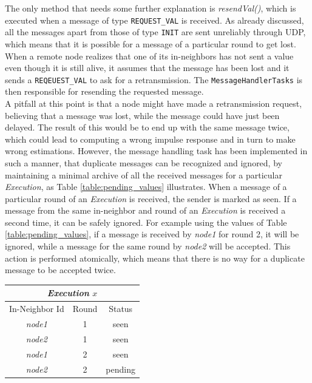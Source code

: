 \documentclass[a4paper,11pt,twoside]{report}
\newcommand{\classname}[1]{\texttt{#1}}
\begin{document}
\begin{description}
The only method that needs some further explanation is \textit{resendVal()}, which is executed when a message of type \classname{REQUEST\_VAL} is received. As already discussed, all the messages apart from those of type \classname{INIT} are sent unreliably through UDP, which means that it is possible for a message of a particular round to get lost. When a remote node realizes that one of its in-neighbors has not sent a value even though it is still alive, it assumes that the message has been lost and it sends a \classname{REQEUEST\_VAL} to ask for a retransmission. The \classname{MessageHandlerTasks} is then responsible for resending the requested message.\\

A pitfall at this point is that a node might have made a retransmission request, believing that a message was lost, while the message could have just been delayed. The result of this would be to end up with the same message twice, which could lead to computing a wrong impulse response and in turn to make wrong estimations. However, the message handling task has been implemented in such a manner, that duplicate messages can be recognized and ignored, by maintaining a minimal archive of all the received messages for a particular \textit{Execution}, as Table \ref{table:pending_values} illustrates. When a message of a particular round of an \textit{Execution} is received, the sender is marked as seen. If a message from the same in-neighbor and round of an \textit{Execution} is received a second time, it can be safely ignored. For example using the values of Table \ref{table:pending_values}, if a message is received by \textit{node1} for round 2, it will be ignored, while a message for the same round by \textit{node2} will be accepted. This action is performed atomically, which means that there is no way for a duplicate message to be accepted twice. 

\begin{table}[H]
\centering
\begin{tabular}{|c|c|c|}

\hline
\multicolumn{3}{|c|}{\textit{Execution} $x$} \\
\hline
\hline
In-Neighbor Id & Round & Status\\
\hline
\textit{node1} & 1 & seen \\
\textit{node2} & 1 & seen \\
\textit{node1} & 2 & seen \\
\textit{node2} & 2 & pending \\
\hline


\end{tabular}
\end{table}
\end{description}
\end{document}
